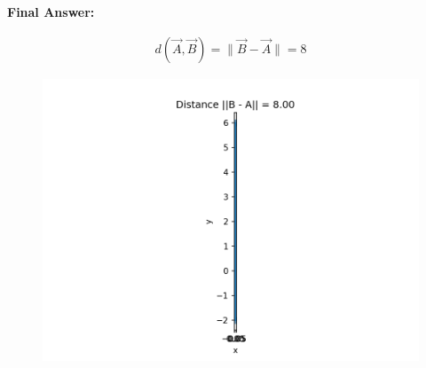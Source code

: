 \documentclass[12pt]{article}
\begin{document}
\textbf{Final Answer:}

\begin{align}
 d(\vec{A},\vec{B}) = \|\vec{B} - \vec{A}\| = 8
\end{align}

\begin{figure}[H]
    \centering
    \includegraphics[width=1\columnwidth]{figs/distance.png}
    \caption{}
    \label{fig:placeholder}
\end{figure}
\end{document}
